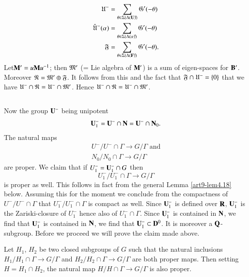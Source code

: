 \begin{align*}
\mathfrak{U}^- & = \sum\limits_{\theta \in \Sigma (\Delta (\mathbf{U}) \hat{})} \mathfrak{G}' (-\theta)\\
\hat{\mathfrak{U}}^- (\alpha) &= \sum\limits_{\theta \in \Sigma (\Delta (\alpha) \hat{})} \mathfrak{G}'(-\theta)\\
\mathfrak{F} & = \sum\limits_{\theta \in \Sigma (\Delta (\mathbf{F}) \hat{})} \mathfrak{G}'(-\theta).
\end{align*}
Let\pageoriginale $\mathbf{M}' = u \mathbf{M} u^{-1}$; then $\mathfrak{M}'$ (= Lie algebra of $\mathbf{M}'$) is a sum of eigen-spaces for $\mathbf{B}'$. Moreover $\mathfrak{N} = \mathfrak{M}' \oplus \mathfrak{F}$. It follows from this and the fact that $\mathfrak{F} \cap \mathfrak{U}^-=\{0\}$ that we have $\mathfrak{U}^- \cap \mathfrak{N} = \mathfrak{U}^- \cap \mathfrak{M}'$. Hence $\mathfrak{U}^- \cap \mathfrak{N} = \mathfrak{U}^- \cap \mathfrak{M}'$.

\subsection{}\label{art9-subsec4.17}
Now the group $\mathbf{U}^-$ being unipotent 
$$
\mathbf{U}^-_1 = \mathbf{U}^- \cap \mathbf{N} = \mathbf{U}^- \cap \mathbf{N}_0.
$$
The natural maps 
\begin{gather*}
U^- / U^- \cap \Gamma \to G/\Gamma \text{ and}\\
N_0 / N_0 \cap \Gamma \to G / \Gamma
\end{gather*}
are proper. We claim that if $U^-_1 = \mathbf{U}^-_1 \cap G$ then
$$
U^-_1 / U^-_1 \cap \Gamma \to G / \Gamma
$$
is proper as well. This follows in fact from the general Lemma \ref{art9-lem4.18} below. Assuming this for the moment we conclude from the compactness of $U^-/U^- \cap \Gamma$ that $U^-_1/ U^-_1 \cap \Gamma$ is compact as well. Since $\mathbf{U}^-_1$ is defined over $\mathbf{R}$, $\mathbf{U}^-_1$ is the Zariski-closure of $U^-_1$ hence also of $U^-_1 \cap \Gamma$. Since $\mathbf{U}^-_1$ is contained in $\mathbf{N}$, we find that $\mathbf{U}^-_1$ is contained in $\mathbf{N}$, we find that $\mathbf{U}^-_1 \subset \mathbf{D}^0$. It is moreover a $\mathbf{Q}$-subgroup. Before we proceed we will prove the claim made above.

\begin{lemma}\label{art9-lem4.18}
Let $H_1$, $H_2$ be two closed subgroups of $G$ such that the natural inclusions $H_1/ H_1 \cap \Gamma \to G / \Gamma$ and $H_2/ H_2 \cap \Gamma \to G/\Gamma$ are both proper maps. Then setting $H = H_1 \cap H_2$, the natural map $H/ H \cap \Gamma \to G / \Gamma$ is also proper.
\end{lemma}

